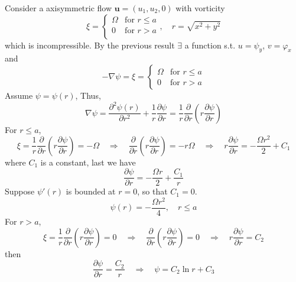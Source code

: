 Consider a axisymmetric flow $\textbf{u} = (u_1,u_2,0)$ with vorticity 
\begin{equation}
\xi = \begin{cases}
\Omega & \text{for } r\leq a\\
0 & \text{for } r> a\\
\end{cases},\quad r = \sqrt{x^2 + y^2}
\end{equation}
which is incompressible. By the previous result $\exists$ a function s.t. $u=\psi_y$, $v=\varphi_x$ and 
\begin{equation}
-\nabla \psi = \xi
= \begin{cases}
\Omega & \text{for } r\leq a\\
0 & \text{for } r>a
\end{cases}
\end{equation}
Assume $\psi = \psi (r)$, Thus, 
\begin{equation}
\nabla \psi = \frac{\partial^2 \psi(r)}{\partial r^2} + \frac{1}{r} \frac{\partial \psi}{\partial r}
= \frac{1}{r}\frac{\partial}{\partial r}\left(r\frac{\partial \psi}{\partial r}\right)
\end{equation}
For $r\leq a$, 
\begin{equation}
\xi = \frac{1}{r}\frac{\partial}{\partial r}\left(r\frac{\partial \psi}{\partial r}\right) = -\Omega
\quad\Rightarrow\quad
\frac{\partial}{\partial r}\left(r\frac{\partial \psi}{\partial r}\right) = -r\Omega
\quad\Rightarrow\quad
r \frac{\partial \psi}{\partial r} = -\frac{\Omega r^2}{2} + C_1
\end{equation}
where $C_1$ is a constant, last we have
\begin{equation}
\frac{\partial \psi}{\partial r} = - \frac{\Omega r}{2} + \frac{C_1}{r}
\end{equation}
Suppose $\psi'(r)$ is bounded at $r=0$, so that $C_1 = 0$.
\begin{equation}
\psi(r) = -\frac{\Omega r^2}{4},\quad r\leq a
\end{equation}
For $r>a$,
\begin{equation}
\xi = \frac{1}{r}\frac{\partial}{\partial r}\left(r\frac{\partial \psi}{\partial r}\right) = 0
\quad\Rightarrow\quad
\frac{\partial}{\partial r}\left(r\frac{\partial \psi}{\partial r}\right) = 0
\quad\Rightarrow\quad
r \frac{\partial \psi}{\partial r} = C_2
\end{equation}
then
\begin{equation}
\frac{\partial \psi}{\partial r} = \frac{C_2}{r}
\quad\Rightarrow\quad
\psi = C_2 \ln r + C_3
\end{equation}
